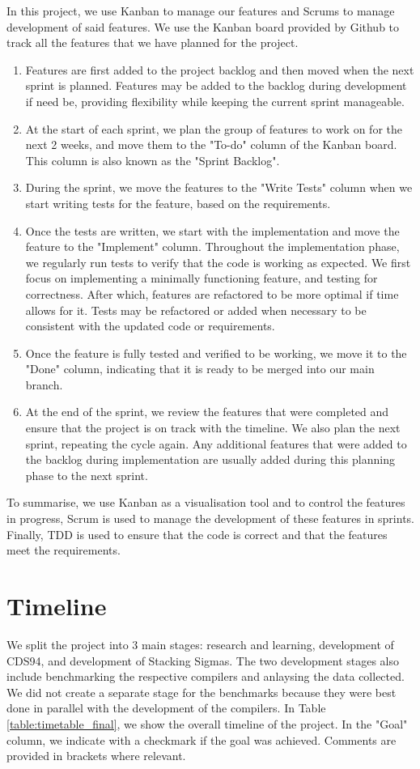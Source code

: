 In this project, we use Kanban to manage our features and Scrums to manage development 
of said features. We use the Kanban board provided by Github to track all 
the features that we have planned for the project.
\begin{enumerate}
  \item Features are first added to the project backlog and then moved when the next sprint is
  planned. Features may be added to the backlog during development if need be, providing 
  flexibility while keeping the current sprint manageable. 
  \item At the start of each sprint, we plan the group of features to work on 
  for the next 2 weeks, and move them to the "To-do" column of the Kanban board. This column 
  is also known as the "Sprint Backlog".
  \item During the sprint, we move the features to the "Write Tests" column when we start writing 
  tests for the feature, based on the requirements.
  \item Once the tests are written, we start with the implementation and 
  move the feature to the "Implement" column. Throughout the implementation phase, we regularly 
  run tests to verify that the code is working as expected. We first focus on implementing 
  a minimally functioning feature, and testing for correctness. After which, features are 
  refactored to be more optimal if time allows for it. Tests may be refactored or added 
  when necessary to be consistent with the updated code or requirements.
  \item Once the feature is 
  fully tested and verified to be working, we move it to the "Done" column, indicating that 
  it is ready to be merged into our main branch. 
  \item At the end of the sprint, we review the features that were completed and ensure that 
  the project is on track with the timeline. We also plan the next sprint, repeating the cycle 
  again. Any additional features that were added to the backlog during implementation are 
  usually added during this planning phase to the next sprint.
\end{enumerate} 

To summarise, we use Kanban as a visualisation tool and to control the features in progress, Scrum 
is used to manage the development of these features in sprints. Finally, TDD is used to ensure 
that the code is correct and that the features meet the requirements. 

\section{Timeline}
We split the project into 3 main stages: research and learning, development of CDS94, and 
development of Stacking Sigmas. The two development stages also include benchmarking the 
respective compilers and anlaysing the data collected. We did not create a separate stage 
for the benchmarks because they were best done in parallel with the development of the
compilers.
In Table \ref{table:timetable_final}, we show the overall timeline of the project. In the "Goal" 
column, we indicate with a checkmark if the goal was achieved. Comments are provided in 
brackets where relevant. 


